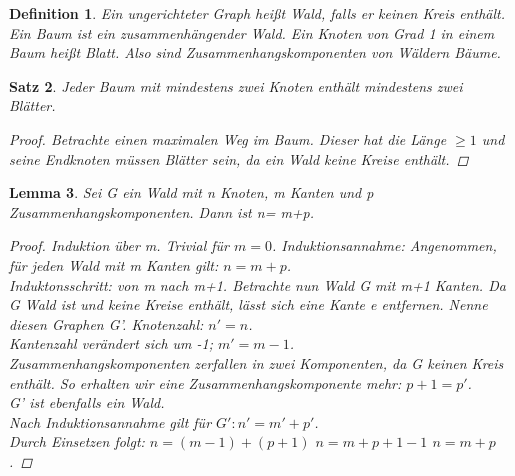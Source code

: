 \documentclass{beamer}
\newtheorem{satz}{Satz}
\newtheorem{defi}[satz]{Definition}
\newtheorem{lem}[satz]{Lemma}
\begin{document}
  \begin{frame}
  \vfill
    \begin{center}
      \begin{defi}
        Ein ungerichteter Graph heißt Wald, falls er keinen Kreis enthält.
       Ein Baum ist ein zusammenhängender Wald.
        Ein Knoten von Grad 1 in einem Baum heißt Blatt.
        Also sind Zusammenhangskomponenten von Wäldern Bäume.
      \end{defi}
    \end{center}
  \vfill
  \end{frame}

  \begin{frame}
  \vfill
    \begin{center}
      \begin{satz} 
        Jeder Baum mit mindestens zwei Knoten enthält mindestens zwei Blätter.
        \begin{proof}
          Betrachte einen maximalen Weg im Baum. Dieser hat die Länge $\geq 1$ und seine Endknoten müssen Blätter sein, da ein Wald keine Kreise enthält.
        \end{proof}
      \end{satz}
    \end{center}
  \vfill
  \end{frame}

  \begin{frame}
  \vfill
    \begin{center}
      \begin{lem}
        Sei G ein Wald mit n Knoten, m Kanten und p Zusammenhangskomponenten. Dann ist n= m+p.
        \begin{proof}
          Induktion über m.
         Trivial für $m=0$.
          Induktionsannahme: Angenommen, für jeden Wald mit m Kanten gilt: $n=m+p$. \\
         Induktonsschritt: von m nach m+1.
          Betrachte nun Wald G mit m+1 Kanten. Da G Wald ist und keine Kreise enthält, lässt sich eine Kante e entfernen. Nenne diesen Graphen G'.
          Knotenzahl: $n'=n$.\\
          Kantenzahl verändert sich um -1; $m'= m-1$.\\
          Zusammenhangskomponenten zerfallen in zwei Komponenten, da G keinen Kreis enthält. So erhalten wir eine Zusammenhangskomponente mehr:
          $p+1=p'$.\\
          G' ist ebenfalls ein Wald.\\
          Nach Induktionsannahme gilt für $G': n'=m'+p'$.\\
          Durch Einsetzen folgt: $n=(m-1)+(p+1)$ \Leftrightarrow $n=m+p+1-1$ \Leftrightarrow $n=m+p$.
        \end{proof}
      \end{lem}
    \end{center}
  \vfill
  \end{frame}
\end{document}

